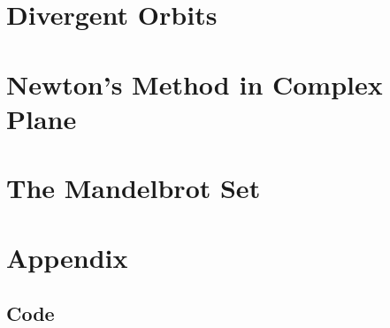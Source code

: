 \documentclass[letterpaper,11pt]{article}
\begin{document}
\section{Divergent Orbits}

\section{Newton's Method in Complex Plane}

\section{The Mandelbrot Set}

\section{Appendix}

\subsection{Code}

\end{document}
